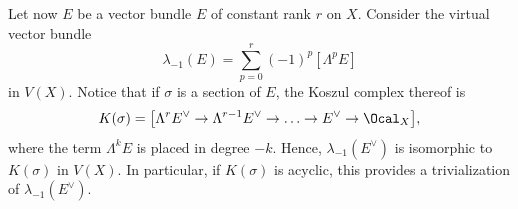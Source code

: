 Let now $E$ be a vector bundle $E$ of constant rank $r$ on $X$. Consider the virtual vector bundle
\begin{equation}\label{eq:lambda-1def}
\lambda_{-1}(E) = \sum_{p=0}^r (-1)^p [\Lambda^p E]
\end{equation}
in $V(X)$. Notice that if $\sigma$ is a section of $E$, the Koszul complex thereof is
\begin{equation}\label{def:lambdaKosz}
K(\sigma) = \bigl[\Lambda^r E^\vee \to \Lambda^{r-1} E^\vee \to \ldots \to E^{\vee} \to \Ocal_X\bigr],
\end{equation}
where the term $\Lambda^{k}E$ is placed in degree $-k$. Hence, $\lambda_{-1}(E^\vee)$ is isomorphic to $K(\sigma)$ in $V(X)$. In particular, if $K(\sigma)$ is acyclic, this provides a trivialization of $\lambda_{-1}(E^{\vee})$.

